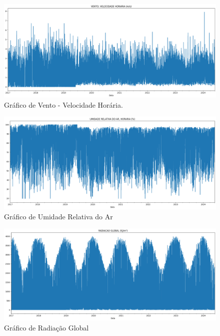 \begin{figure}[H]
	\caption{\label{fig:vento_velocidade_horaria}Gráfico de Vento - Velocidade Horária.}
	\begin{center}
		\includegraphics[scale=0.35]{figuras/vento_velocidade_horaria.png}
	\end{center}
\end{figure}

\begin{figure}[H]
	\caption{\label{fig:umidade_relativa_do_ar}Gráfico de Umidade Relativa do Ar}
	\begin{center}
		\includegraphics[scale=0.35]{figuras/umidade_relativa_do_ar.png}
	\end{center}
\end{figure}

\begin{figure}[H]
	\caption{\label{fig:radiacao_global}Gráfico de Radiação Global}
	\begin{center}
		\includegraphics[scale=0.35]{figuras/radiacao_global.png}
	\end{center}
\end{figure}

